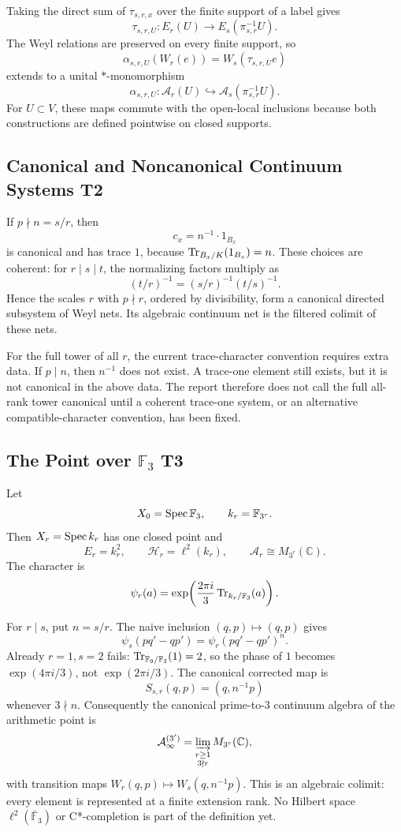 Taking the direct sum of \(\tau_{s,r,x}\) over the finite support of a label
gives
\[
  \tau_{s,r,U}:E_r(U)\to E_s(\pi_{s,r}^{-1}U).
\]
The Weyl relations are preserved on every finite support, so
\[
  \alpha_{s,r,U}(W_r(e))=W_s(\tau_{s,r,U}e)
\]
extends to a unital \(*\)-monomorphism
\[
  \alpha_{s,r,U}:\mathcal A_r(U)\hookrightarrow
  \mathcal A_s(\pi_{s,r}^{-1}U).
\]
For \(U\subset V\), these maps commute with the open-local inclusions because
both constructions are defined pointwise on closed supports.

\subsection{Canonical and Noncanonical Continuum Systems T2}

If \(p\nmid n=s/r\), then
\[
  c_x=n^{-1}\cdot1_{B_x}
\]
is canonical and has trace \(1\), because
\(\operatorname{Tr}_{B_x/K}(1_{B_x})=n\).  These choices are coherent: for
\(r\mid s\mid t\), the normalizing factors multiply as
\[
  (t/r)^{-1}=(s/r)^{-1}(t/s)^{-1}.
\]
Hence the scales \(r\) with \(p\nmid r\), ordered by divisibility, form a
canonical directed subsystem of Weyl nets.  Its algebraic continuum net is the
filtered colimit of these nets.

For the full tower of all \(r\), the current trace-character convention
requires extra data.  If \(p\mid n\), then \(n^{-1}\) does not exist.  A
trace-one element still exists, but it is not canonical in the above data.
The report therefore does not call the full all-rank tower canonical until a
coherent trace-one system, or an alternative compatible-character convention,
has been fixed.

\subsection{The Point over \texorpdfstring{\(\mathbb F_3\)}{F3} T3}

Let
\[
  X_0=\operatorname{Spec}\mathbb F_3,\qquad k_r=\mathbb F_{3^r}.
\]
Then \(X_r=\operatorname{Spec} k_r\) has one closed point and
\[
  E_r=k_r^2,\qquad
  \mathcal H_r=\ell^2(k_r),\qquad
  \mathcal A_r\cong M_{3^r}(\mathbb C).
\]
The character is
\[
  \psi_r(a)=\exp\!\left(\frac{2\pi i}{3}
  \operatorname{Tr}_{k_r/\mathbb F_3}(a)\right).
\]

For \(r\mid s\), put \(n=s/r\).  The naive inclusion
\((q,p)\mapsto(q,p)\) gives
\[
  \psi_s(pq'-q p')=\psi_r(pq'-q p')^n.
\]
Already \(r=1,s=2\) fails: \(\operatorname{Tr}_{\mathbb F_9/\mathbb F_3}(1)=2\), so the
phase of \(1\) becomes \(\exp(4\pi i/3)\), not \(\exp(2\pi i/3)\).
The canonical corrected map is
\[
  S_{s,r}(q,p)=(q,n^{-1}p)
\]
whenever \(3\nmid n\).  Consequently the canonical prime-to-\(3\) continuum
algebra of the arithmetic point is
\[
  \mathcal A_{\infty}^{(3')}
  =
  \varinjlim_{\substack{r\ge1\\3\nmid r}} M_{3^r}(\mathbb C),
\]
with transition maps \(W_r(q,p)\mapsto W_s(q,n^{-1}p)\).  This is an
algebraic colimit: every element is represented at a finite extension rank.
No Hilbert space \(\ell^2(\bar{\mathbb F}_3)\) or C*-completion is part of the
definition yet.

